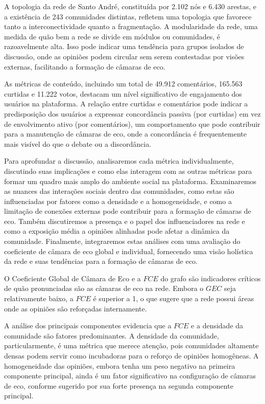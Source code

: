 A topologia da rede de Santo André, constituída por 2.102 nós e 6.430 arestas, e a existência de 243 comunidades distintas, refletem uma topologia que favorece tanto a interconectividade quanto a fragmentação. A modularidade da rede, uma medida de quão bem a rede se divide em módulos ou comunidades, é razoavelmente alta. Isso pode indicar uma tendência para grupos isolados de discussão, onde as opiniões podem circular sem serem contestadas por visões externas, facilitando a formação de câmaras de eco.

As métricas de conteúdo, incluindo um total de 49.912 comentários, 165.563 curtidas e 11.222 votos, destacam um nível significativo de engajamento dos usuários na plataforma. A relação entre curtidas e comentários pode indicar a predisposição dos usuários a expressar concordância passiva (por curtidas) em vez de envolvimento ativo (por comentários), um comportamento que pode contribuir para a manutenção de câmaras de eco, onde a concordância é frequentemente mais visível do que o debate ou a discordância.

Para aprofundar a discussão, analisaremos cada métrica individualmente, discutindo suas implicações e como elas interagem com as outras métricas para formar um quadro mais amplo do ambiente social na plataforma. Examinaremos as nuances das interações sociais dentro das comunidades, como estas são influenciadas por fatores como a densidade e a homogeneidade, e como a limitação de conexões externas pode contribuir para a formação de câmaras de eco. Também discutiremos a presença e o papel dos influenciadores na rede e como a exposição média a opiniões alinhadas pode afetar a dinâmica da comunidade. Finalmente, integraremos estas análises com uma avaliação do coeficiente de câmara de eco global e individual, fornecendo uma visão holística da rede e suas tendências para a formação de câmaras de eco.

O Coeficiente Global de Câmara de Eco e a $FCE$ do grafo são indicadores críticos de quão pronunciadas são as câmaras de eco na rede. Embora o $GEC$ seja relativamente baixo, a $FCE$ é superior a 1, o que sugere que a rede possui áreas onde as opiniões são reforçadas internamente.

A análise dos principais componentes evidencia que a $FCE$ e a densidade da comunidade são fatores predominantes. A densidade da comunidade, particularmente, é uma métrica que merece atenção, pois comunidades altamente densas podem servir como incubadoras para o reforço de opiniões homogêneas. A homogeneidade das opiniões, embora tenha um peso negativo na primeira componente principal, ainda é um fator significativo na configuração de câmaras de eco, conforme sugerido por sua forte presença na segunda componente principal.


